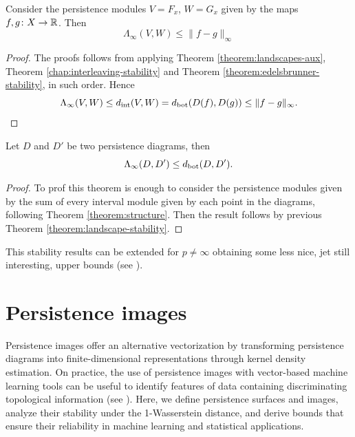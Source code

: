\begin{theorem} \label{theorem:landscape-stability}
    Consider the persistence modules $ V = F_x $, $ W = G_x $ given by the maps $ f, g \colon X \to \mathbb R $. Then
    \begin{equation}
        \Lambda_\infty(V, W) \leq \| f - g\|_\infty
    \end{equation}
\end{theorem}
\begin{proof}
    The proofs follows from applying Theorem \ref{theorem:landscapes-aux}, Theorem \ref{chap:interleaving-stability} and Theorem \ref{theorem:edelsbrunner-stability}, in such order. Hence
    \begin{equation}
        \Lambda_\infty(V, W) \leq d_{\operatorname{int}}(V, W) = d_{\operatorname{bot}}(D(f), D(g)) \leq \| f - g\|_\infty.
    \end{equation}
\end{proof}

\begin{theorem}
    Let $ D $ and $ D' $ be two persistence diagrams, then
    \begin{equation}
        \Lambda_\infty(D, D') \leq d_{\operatorname{bot}}(D, D').
    \end{equation}
\end{theorem}
\begin{proof}
    To prof this theorem is enough to consider the persistence modules given by the sum of every interval module given by each point in the diagrams, following Theorem \ref{theorem:structure}. Then the result follows by previous Theorem \ref{theorem:landscape-stability}.
\end{proof}

This stability results can be extended for $ p \neq \infty $ obtaining some less nice, jet still interesting, upper bounds (see \cite{bubenik}).

\section{Persistence images} \label{sec:images}

Persistence images offer an alternative vectorization by transforming persistence diagrams into finite-dimensional representations through kernel density estimation. On practice, the use of persistence images with vector-based machine learning tools can be useful to identify features of data containing discriminating topological information (see \cite{adams}). Here, we define persistence surfaces and images, analyze their stability under the 1-Wasserstein distance, and derive bounds that ensure their reliability in machine learning and statistical applications.

